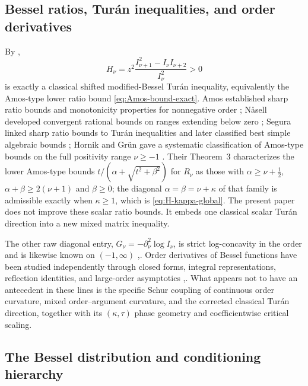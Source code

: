 \documentclass[11pt,a4paper]{amsart}
\numberwithin{equation}{section}
\theoremstyle{plain}
\theoremstyle{definition}
\begin{document}
\subsection{Bessel ratios, Tur\'an inequalities, and order derivatives}\label{subsec:bessel-ratios-turan-inequalities}

By ,
\[
 H_\nu
 =z^2\frac{I_{\nu+1}^2-I_\nu I_{\nu+2}}{I_\nu^2}>0
\]
is exactly a classical shifted modified-Bessel Tur\'an inequality, equivalently
the Amos-type lower ratio bound \eqref{eq:Amos-bound-exact}.  Amos established
sharp ratio bounds and monotonicity properties for nonnegative order
\cite{Amos1974Ratios}; N\aa sell developed convergent rational bounds on ranges
extending below zero \cite{Nasell1978Rational}; Segura linked sharp ratio bounds
to Tur\'an inequalities and later classified best simple algebraic bounds
\cite{Segura2011BoundsRatios,Segura2023BestBounds}; Hornik and Gr\"un gave a
systematic classification of Amos-type bounds on the full positivity range
\(\nu\ge-1\) \cite{HornikGrun2013Amos}.  Their Theorem~3 characterizes the
lower Amos-type bounds \(t/(\alpha+\sqrt{t^2+\beta^2})\) for \(R_\nu\) as those
with \(\alpha\ge\nu+\tfrac12\), \(\alpha+\beta\ge2(\nu+1)\) and \(\beta\ge0\);
the diagonal \(\alpha=\beta=\nu+\kappa\) of that family is admissible exactly
when \(\kappa\ge1\), which is \eqref{eq:H-kappa-global}.  The present paper does
not improve these scalar ratio bounds.  It embeds one classical scalar Tur\'an
direction into a new mixed matrix inequality.

The other raw diagonal entry,
\(G_\nu=-\partial_\nu^2\log I_\nu\), is strict log-concavity in the order and
is likewise known on \((-1,\infty)\)
\cite[Ex.~1]{KalmykovKarp2013Reciprocal},\cite[Thm.~3]{Nanthanasub2019LogConcavity}.  Order derivatives of Bessel
functions have been studied independently through closed forms, integral
representations, reflection identities, and large-order asymptotics
\cite[\S10.38]{NISTDLMFOrder},\cite{Brychkov2016HigherDerivatives,Dunster2017OrderDerivatives,GonzalezSantander2018ClosedForm,GonzalezSantander2023ReflectionFormulas}.
What appears not to have an antecedent in these lines is the specific Schur
coupling of continuous order curvature, mixed order--argument curvature, and
the corrected classical Tur\'an direction, together with its
\((\kappa,\tau)\) phase geometry and coefficientwise critical scaling.

\subsection{The Bessel distribution and conditioning hierarchy}\label{subsec:bessel-distribution-conditioning-hierarchy}
\end{document}

